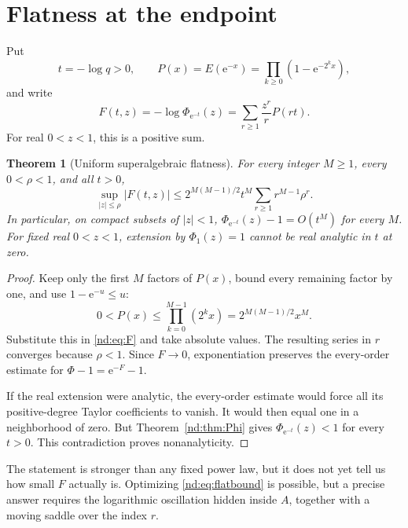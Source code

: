 \documentclass[11pt,a4paper,oneside,openany]{book}
\numberwithin{equation}{chapter}
\newtheorem{theorem}{Theorem}[chapter]
\theoremstyle{definition}
\theoremstyle{remark}
\newcommand{\e}{\mathrm e}
\begin{document}
\section{Flatness at the endpoint}
Put
\begin{equation}
 t=-\log q>0,\qquad
 P(x)=E(\e^{-x})=\prod_{k\ge0}(1-\e^{-2^kx}),
 \label{nd:eq:A}
\end{equation}
and write
\begin{equation}
 F(t,z)=-\log\Phi_{\e^{-t}}(z)
       =\sum_{r\ge1}\frac{z^r}{r}P(rt).
 \label{nd:eq:F}
\end{equation}
For real \(0<z<1\), this is a positive sum.

\begin{theorem}[Uniform superalgebraic flatness]
\label{nd:thm:flat}
For every integer \(M\ge1\), every \(0<\rho<1\), and all \(t>0\),
\begin{equation}
 \sup_{|z|\le\rho}|F(t,z)|
 \le 2^{M(M-1)/2}t^M\sum_{r\ge1}r^{M-1}\rho^r.
 \label{nd:eq:flatbound}
\end{equation}
In particular, on compact subsets of \(|z|<1\),
\(\Phi_{\e^{-t}}(z)-1=O(t^M)\) for every \(M\). For fixed real \(0<z<1\),
extension by \(\Phi_1(z)=1\) cannot be real analytic in \(t\) at zero.
\end{theorem}
\begin{proof}
Keep only the first \(M\) factors of \(P(x)\), bound every remaining factor
by one, and use \(1-\e^{-u}\le u\):
\begin{equation}
 0<P(x)\le\prod_{k=0}^{M-1}(2^kx)
             =2^{M(M-1)/2}x^M.
 \label{nd:eq:Abound}
\end{equation}
Substitute this in \eqref{nd:eq:F} and take absolute values. The resulting series
in \(r\) converges because \(\rho<1\). Since \(F\to0\), exponentiation
preserves the every-order estimate for \(\Phi-1=\e^{-F}-1\).

If the real extension were analytic, the every-order estimate would force
all its positive-degree Taylor coefficients to vanish. It would then equal
one in a neighborhood of zero. But Theorem~\ref{nd:thm:Phi} gives
\(\Phi_{\e^{-t}}(z)<1\) for every \(t>0\). This contradiction proves
nonanalyticity.
\end{proof}

The statement is stronger than any fixed power law, but it does not yet tell
us how small \(F\) actually is. Optimizing \eqref{nd:eq:flatbound} is possible,
but a precise answer requires the logarithmic oscillation hidden inside
\(A\), together with a moving saddle over the index \(r\).
\end{document}
